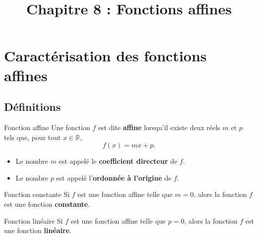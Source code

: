\documentclass[11pt]{article}
\title{Chapitre 8 : Fonctions affines}
\date{}
\author{}
\begin{document}
\maketitle\thispagestyle{fancy}

%

\section{Caractérisation des fonctions affines}
\subsection{Définitions}

\begin{defi}{Fonction affine}
  Une fonction $f$ est dite \textbf{affine} lorsqu'il existe deux réels $m$ et
  $p$ tels que, pour tout $x\in\mathbb{R}$, $$f(x)=mx+p.$$
  \begin{itemize}
    \item Le nombre $m$ est appelé le \textbf{coefficient directeur} de $f$.
    \item Le nombre $p$ est appelé l'\textbf{ordonnée à l'origine} de $f$.
  \end{itemize}
\end{defi}

\begin{defi}{Fonction constante}
  Si $f$ est une fonction affine telle que $m=0$, alors la fonction $f$ est une
  fonction \textbf{constante}.
\end{defi}

\begin{defi}{Fonction linéaire}
  Si $f$ est une fonction affine telle que $p=0$, alors la fonction $f$ est une
  fonction \textbf{linéaire}.
\end{defi}
\end{document}
